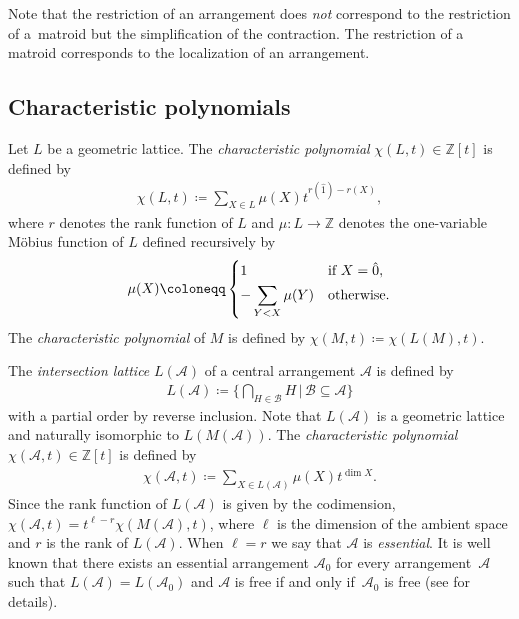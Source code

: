 Note that the restriction of an arrangement does \emph{not} correspond to the restriction of a~matroid but the simplification of the contraction.
The restriction of a matroid corresponds to the localization of an arrangement.

\subsection{Characteristic polynomials}

Let $ L $ be a geometric lattice.
The \textit{characteristic polynomial} $ \chi(L,t) \in \mathbb{Z}[t] $ is defined by
\begin{gather*}
\chi(L,t) \coloneqq \sum_{X \in L}\mu(X)t^{r(\hat{1}) - r(X)},
\end{gather*}
where $ r $ denotes the rank function of $ L $ and $ \mu \colon L \to \mathbb{Z} $ denotes the one-variable M\"{o}bius function of $ L $ defined recursively by{\samepage
\begin{gather*}
\mu(X) \coloneqq \begin{cases}
 1 & \text{if } X = \hat{0}, \vspace{1mm}\\
-\displaystyle\sum_{Y < X}\mu(Y) & \text{otherwise.}
\end{cases}
\end{gather*}
The \textit{characteristic polynomial} of $ M $ is defined by $ \chi(M,t) \coloneqq \chi(L(M),t) $.}

The \textit{intersection lattice} $ L(\mathcal{A}) $ of a central arrangement $ \mathcal{A} $ is defined by
\begin{gather*}
L(\mathcal{A}) \coloneqq \bigg\{ \bigcap_{H \in \mathcal{B}}H \,\bigg|\, \mathcal{B} \subseteq \mathcal{A} \bigg\}
\end{gather*}
with a partial order by reverse inclusion.
Note that $ L(\mathcal{A}) $ is a geometric lattice and naturally isomorphic to $ L(M(\mathcal{A})) $.
The \textit{characteristic polynomial} $ \chi(\mathcal{A}, t) \in \mathbb{Z}[t] $ is defined by
\begin{gather*}
\chi(\mathcal{A},t) \coloneqq \sum_{X \in L(\mathcal{A})}\mu(X)t^{\dim X}.
\end{gather*}
Since the rank function of $ L(\mathcal{A}) $ is given by the codimension, $ \chi(\mathcal{A},t) = t^{\ell-r}\chi(M(\mathcal{A}), t) $, where $ \ell $ is the dimension of the ambient space and $ r $ is the rank of $ L(\mathcal{A}) $.
When $ \ell = r $ we say that $ \mathcal{A} $ is \textit{essential}.
It is well known that there exists an essential arrangement $ \mathcal{A}_{0} $ for every arrangement~$ \mathcal{A} $ such that $ L(\mathcal{A}) = L(\mathcal{A}_{0}) $ and $ \mathcal{A} $ is free if and only if~$ \mathcal{A}_{0} $ is free (see \cite{orlik1992arrangements} for details).

